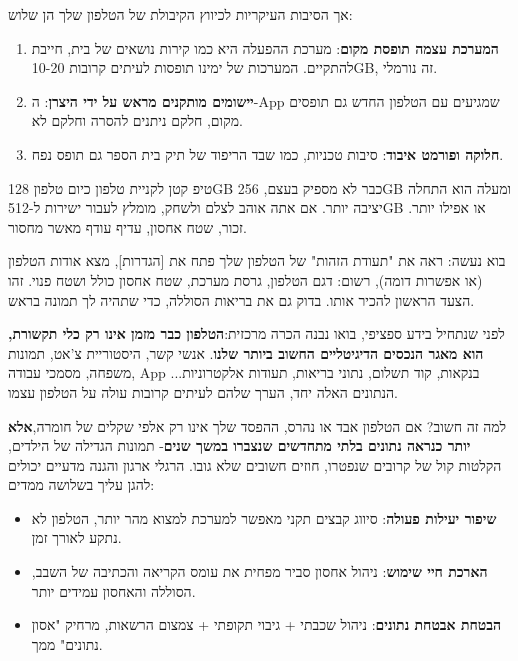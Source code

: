 אך הסיבות העיקריות לכיווץ הקיבולת של הטלפון שלך הן שלוש:

\begin{enumerate}
  \item \textbf{המערכת עצמה תופסת מקום}: מערכת ההפעלה היא כמו קירות נושאים של בית, חייבת להתקיים. המערכות של ימינו תופסות לעיתים קרובות 10-20GB, זה נורמלי.
  \item \textbf{יישומים מותקנים מראש על ידי היצרן}: ה-App שמגיעים עם הטלפון החדש גם תופסים מקום, חלקם ניתנים להסרה וחלקם לא.
  \item \textbf{חלוקה ופורמט איבוד}: סיבות טכניות, כמו שבד הריפוד של תיק בית הספר גם תופס נפח.
\end{enumerate}

\begin{tcbinfo}{טיפ קטן לקניית טלפון}
כיום טלפון 128GB כבר לא מספיק בעצם, 256GB ומעלה הוא התחלה יציבה יותר. אם אתה אוהב לצלם ולשחק, מומלץ לעבור ישירות ל-512GB או אפילו יותר. זכור, שטח אחסון, עדיף עודף מאשר מחסור.

\end{tcbinfo}

\begin{tcbpractice}{בוא נעשה: ראה את "תעודת הזהות" של הטלפון שלך}
פתח את [הגדרות], מצא אודות הטלפון (או אפשרות דומה), רשום: דגם הטלפון, גרסת מערכת, שטח אחסון כולל ושטח פנוי. זהו הצעד הראשון להכיר אותו. בדוק גם את בריאות הסוללה, כדי שתהיה לך תמונה בראש.

\end{tcbpractice}


לפני שנתחיל בידע ספציפי, בואו נבנה הכרה מרכזית:\textbf{הטלפון כבר מזמן אינו רק כלי תקשורת, הוא מאגר הנכסים הדיגיטליים החשוב ביותר שלנו}. אנשי קשר, היסטוריית צ'אט, תמונות משפחה, מסמכי עבודה, App בנקאות, קוד תשלום, נתוני בריאות, תעודות אלקטרוניות... הנתונים האלה יחד, הערך שלהם לעיתים קרובות עולה על הטלפון עצמו.

\begin{tcbinfo}{למה זה חשוב?}
אם הטלפון אבד או נהרס, ההפסד שלך אינו רק אלפי שקלים של חומרה,\textbf{אלא יותר כנראה נתונים בלתי מתחדשים שנצברו במשך שנים}- תמונות הגדילה של הילדים, הקלטות קול של קרובים שנפטרו, חוזים חשובים שלא גובו. הרגלי ארגון והגנה מדעיים יכולים להגן עליך בשלושה ממדים:

\begin{itemize}
  \item \textbf{שיפור יעילות פעולה}: סיווג קבצים תקני מאפשר למערכת למצוא מהר יותר, הטלפון לא נתקע לאורך זמן.
  \item \textbf{הארכת חיי שימוש}: ניהול אחסון סביר מפחית את עומס הקריאה והכתיבה של השבב, הסוללה והאחסון עמידים יותר.
  \item \textbf{הבטחת אבטחת נתונים}: ניהול שכבתי + גיבוי תקופתי + צמצום הרשאות, מרחיק "אסון נתונים" ממך.
\end{itemize}

\end{tcbinfo}

